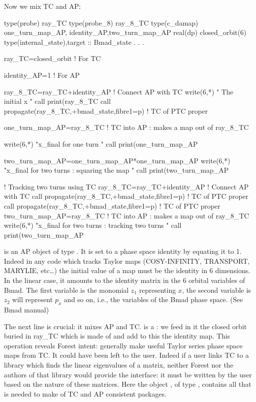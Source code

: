 \documentclass{hitec}     %
\begin{document}
{{{{{{Now we mix TC and AP:
 \begin{code}
type(probe) ray_TC 
type(probe_8) ray_8_TC
type(c_damap)  one_turn_map_AP, identity_AP,two_turn_map_AP
real(dp)  closed_orbit(6)
type(internal_state),target :: Bmad_state
   .
   .
   .

ray_TC=closed_orbit   !  For TC

identity_AP=1  !  For AP

ray_8_TC=ray_TC+identity_AP   ! Connect AP with TC
write(6,*) " The initial x "
call print(ray_8_TC%
call propagate(ray_8_TC,+bmad_state,fibre1=p) ! TC of PTC proper

one_turn_map_AP=ray_8_TC ! TC into AP : makes a map out of ray_8_TC

write(6,*) "x_final for one turn "
call print(one_turn_map_AP%

two_turn_map_AP=one_turn_map_AP*one_turn_map_AP
write(6,*) "x_final for two turns : squaring the map "
call print(two_turn_map_AP%

!  Tracking two turns using TC
ray_8_TC=ray_TC+identity_AP   ! Connect AP with TC
call propagate(ray_8_TC,+bmad_state,fibre1=p) ! TC of PTC proper
call propagate(ray_8_TC,+bmad_state,fibre1=p) ! TC of PTC proper
two_turn_map_AP=ray_8_TC ! TC into AP : makes a map out of ray_8_TC
write(6,*) "x_final for two turns : tracking two turns "
call print(two_turn_map_AP%
\end{code}

 is an AP object of type . It is set to a phase space identity by equating it to 1. Indeed in any code which tracks Taylor maps (COSY-INFINITY, TRANSPORT, MARYLIE, etc\ldots) the initial value of a map must be the identity in 6 dimensions. In the linear case, it amounts to the identity matrix in the 6 orbital variables of Bmad. The first variable is the monomial $z_1$ representing $x$, the second variable is $z_2$ will represent $p_x$ and so on, i.e., the variables of the Bmad phase space. (See Bmad manual)

The next line is crucial: it mixes AP and TC.  is a : we feed in it the closed orbit buried in ray_TC which is made of  and add to this the identity map. This operation  reveals  Forest intent: generally make useful Taylor series phase space maps from TC. It could have been left to the user. Indeed if a user  links TC to a library which finds the linear eigenvalues of a matrix, neither Forest nor the authors of that library would provide the interface: it must be written by the user based on the nature of these matrices. Here the object , of type , contains all that is needed to make  of TC and AP  consistent packages. 

}}}}}}
\end{document}
